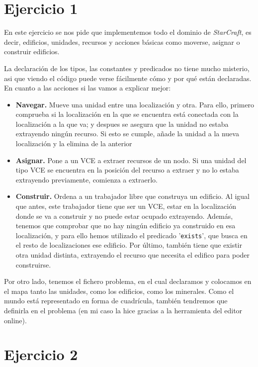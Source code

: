 \documentclass[11pt,a4paper]{article}
\begin{document}
\section*{Ejercicio 1}
En este ejercicio se nos pide que implementemos todo el dominio de \textit{StarCraft}, es decir, edificios, unidades, recursos y
acciones básicas como moverse, asignar o construir edificios.

La declaración de los tipos, las constantes y predicados no tiene mucho misterio, asi que viendo el código puede verse fácilmente
cómo y por qué están declaradas. En cuanto a las acciones si las vamos a explicar mejor:

\begin{itemize}
    \item \textbf{Navegar.} Mueve una unidad entre una localización y otra. Para ello, primero comprueba si la localización en la
          que se encuentra está conectada con la localización a la que va; y despues se asegura que la unidad no estaba extrayendo
          ningún recurso. Si esto se cumple, añade la unidad a la nueva localización y la elimina de la anterior
    \item \textbf{Asignar.} Pone a un VCE a extraer recursos de un nodo. Si una unidad del tipo VCE se encuentra en la posición
          del recurso a extraer y no lo estaba extrayendo previamente, comienza a extraerlo.
    \item \textbf{Construir.} Ordena a un trabajador libre que construya un edificio. Al igual que antes, este trabajador tiene
          que ser un VCE, estar en la localización donde se va a construir y no puede estar ocupado extrayendo. Además, tenemos
          que comprobar que no hay ningún edificio ya construido en esa localización, y para ello hemos utilizado el predicado
          '\texttt{exists}', que busca en el resto de localizaciones ese edificio. Por último, también tiene que existir otra
          unidad distinta, extrayendo el recurso que necesita el edifico para poder construirse.
\end{itemize}

Por otro lado, tenemos el fichero problema, en el cual declaramos y colocamos en el mapa tanto las unidades, como los edificios,
como los minerales. Como el mundo está representado en forma de cuadrícula, también tendremos que definirla en el problema
(en mi caso la hice gracias a la herramienta del editor online).



\section*{Ejercicio 2}
\end{document}
